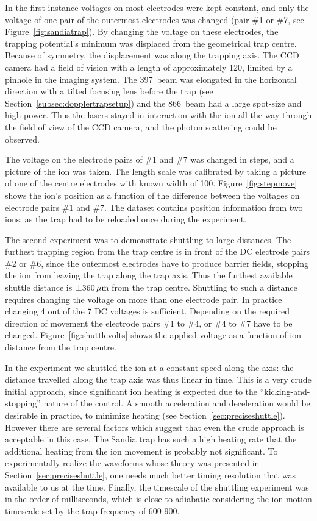 In the first instance voltages on most electrodes were kept constant, and only the voltage of one pair of the outermost electrodes was changed (pair \#1 or \#7, see Figure~\ref{fig:sandiatrap}). By changing the voltage on these electrodes, the trapping potential's minimum was displaced from the geometrical trap centre. Because of symmetry, the displacement was along the trapping axis. The CCD camera had a field of vision with a length of approximately 120\um, limited by a pinhole in the imaging system. The 397\nm\, beam was elongated in the horizontal direction with a tilted focusing lens before the trap (see Section~\ref{subsec:dopplertrapsetup}) and the 866\nm\, beam had a large spot-size and high power. Thus the lasers stayed in interaction with the ion all the way through the field of view of the CCD camera, and the photon scattering could be observed.

The voltage on the electrode pairs of \#1 and \#7 was changed in steps, and a picture of the ion was taken. The length scale was calibrated by taking a picture of one of the centre electrodes with known width of 100\um. Figure~\ref{fig:stepmove} shows the ion's position as a function of the difference between the voltages on electrode pairs \#1 and \#7. The dataset contains position information from two ions, as the trap had to be reloaded once during the experiment. 


The second experiment was to demonstrate shuttling to large distances. The furthest trapping region from the trap centre is in front of the DC electrode pairs \#2 or \#6, since the outermost electrodes have to produce barrier fields, stopping the ion from leaving the trap along the trap axis. Thus the furthest available shuttle distance is $\pm360\,\mbox{$\mu$m}$ from the trap centre. Shuttling to such a distance requires changing the voltage on more than one electrode pair. In practice changing 4 out of the 7 DC voltages is sufficient. Depending on the required direction of movement the electrode pairs \#1 to \#4, or \#4 to \#7 have to be changed. Figure~\ref{fig:shuttlevolts} shows the applied voltage as a function of ion distance from the trap centre. 

In the experiment we shuttled the ion at a constant speed along the axis: the distance travelled along the trap axis was thus linear in time. This is a very crude initial approach, since significant ion heating is expected due to the ``kicking-and-stopping'' nature of the control. A smooth acceleration and deceleration would be desirable in practice, to minimize heating (see Section~\ref{sec:preciseshuttle}). However there are several factors which suggest that even the crude approach is acceptable in this case. The Sandia trap has such a high heating rate that the additional heating from the ion movement is probably not significant. To experimentally realize the waveforms whose theory was presented in Section~\ref{sec:preciseshuttle}, one needs much better timing resolution that was available to us at the time. Finally, the timescale of the shuttling experiment was in the order of milliseconds, which is close to adiabatic considering the ion motion timescale set by the trap frequency of 600-900\kHz.

